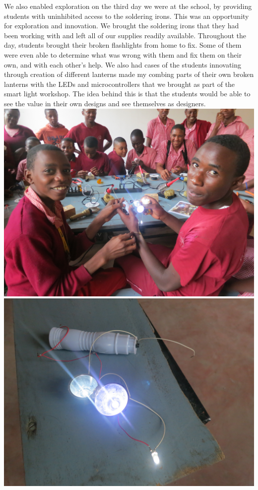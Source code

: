 \documentclass[11pt, twocolumn]{article}
\begin{document}
We also enabled exploration on the third day we were at the school, by providing students with uninhibited access to the soldering irons. This was an opportunity for exploration and innovation. We brought the soldering irons that they had been working with and left all of our supplies readily available. Throughout the day, students brought their broken flashlights from home to fix. Some of them were even able to determine what was wrong with them and fix them on their own, and with each other’s help. We also had cases of the students innovating through creation of different lanterns made my combing parts of their own broken lanterns with the LEDs and microcontrollers that we brought as part of the smart light workshop. The idea behind this is that the students would be able to see the value in their own designs and see themselves as designers.
\includegraphics[width=\columnwidth]{innovation_students.jpg}\\
\includegraphics[width=\columnwidth]{innovation_lantern.jpg}
\end{document}

